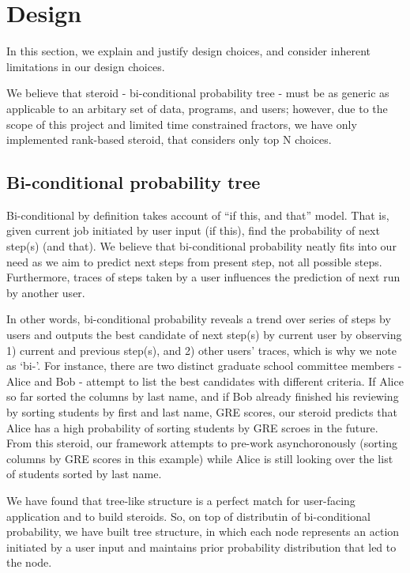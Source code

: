 \section{Design}
\label{sec:design}
In this section, we explain and justify design choices, and consider inherent
limitations in our design choices.

We believe that steroid - bi-conditional probability tree - must be as generic
as applicable to an arbitary set of data, programs, and users; 
however, due to the scope of this project and limited time constrained fractors,
we have only implemented rank-based steroid, that considers only top N choices.

\subsection{Bi-conditional probability tree}
Bi-conditional by definition takes account of ``if this, and that'' model. 
That is, given current job initiated by user input (if this), find the probability of next
step(s) (and that). 
We believe that bi-conditional probability neatly fits into our need as we aim
to predict next steps from present step, not all possible steps.
Furthermore, traces of steps taken by a user influences the prediction of next
run by another user.

In other words, bi-conditional probability reveals a trend over series of steps
by users and outputs the best candidate of next step(s) by current user by
observing 1) current and previous step(s), and 2) other users' traces, which
is why we note as `bi-'.
For instance, there are two distinct graduate school committee members - Alice
and Bob - attempt to list the best candidates with different criteria.  If Alice
so far sorted the columns by last name, and if Bob already finished his
reviewing by sorting students by first and last name, GRE scores, our steroid
predicts that Alice has a high probability of sorting students by GRE scroes in
the future.  From this steroid, our framework attempts to pre-work
asynchoronously (sorting columns by GRE scores in this example) while Alice is
still looking over the list of students sorted by last name. 

We have found that tree-like structure is a perfect match for user-facing
application and to build steroids. So, on top of distributin of bi-conditional
probability, we have built tree structure, in which each node represents an
action initiated by a user input and maintains prior probability distribution
that led to the node. 

